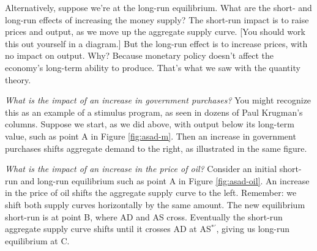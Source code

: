 \documentclass[letterpaper,12pt]{article}
\begin{document}
Alternatively, suppose we're at the long-run equilibrium.
What are the short- and long-run effects of increasing the 
money supply?  
The short-run impact is to raise prices and output, as
we move up the aggregate supply curve.
[You should work this out yourself in a diagram.]
But the long-run effect is to increase prices, 
with no impact on output.
Why?  Because monetary policy doesn't affect 
the economy's long-term ability to produce.  
That's what we saw with the quantity theory.  

{\it What is the impact of an increase in government purchases?\/}
You might recognize this as an example of a stimulus program, 
as seen in dozens of Paul Krugman's columns.  
Suppose we start, as we did above, with output below
its long-term value, 
such as point A in Figure \ref{fig:asad-m}.
Then an increase in government purchases shifts aggregate demand
to the right, as illustrated in the same figure.  


{\it What is the impact of an increase in the price of oil?\/}
Consider an initial short-run and long-run
equilibrium such as point A in Figure \ref{fig:asad-oil}.
An increase in the price of oil
shifts the aggregate supply curve to the left.
Remember:  we shift both supply curves horizontally
by the same amount.
The new equilibrium short-run is at point B,
where AD and AS cross.
Eventually the short-run aggregate supply curve shifts until
it crosses AD at AS$^{*'}$, giving us long-run equilibrium at C.
\end{document}

